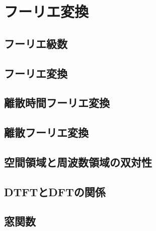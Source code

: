 \section{フーリエ変換}

\subsection{フーリエ級数}

\subsection{フーリエ変換}

\subsection{離散時間フーリエ変換}

\subsection{離散フーリエ変換}

\subsection{空間領域と周波数領域の双対性}

\subsection{DTFTとDFTの関係}

\subsection{窓関数}
